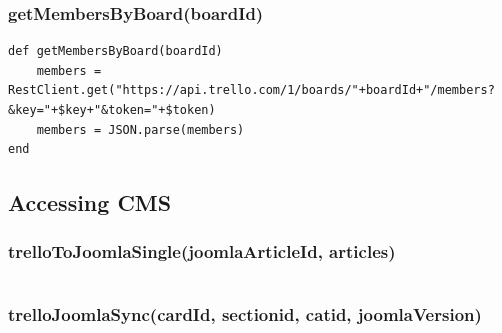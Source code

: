 \subsubsection{getMembersByBoard(boardId)}
\begin{lstlisting}[aboveskip=1\baselineskip, caption= getMembersByBoard(), label=listing060]
def getMembersByBoard(boardId)
	members = RestClient.get("https://api.trello.com/1/boards/"+boardId+"/members?&key="+$key+"&token="+$token)
	members = JSON.parse(members)	
end
\end{lstlisting}

\subsection{Accessing CMS}

\subsubsection{trelloToJoomlaSingle(joomlaArticleId, articles)}
\begin{lstlisting}[aboveskip=1\baselineskip, caption= trelloToJoomlaSingle(), label=listing061]

\end{lstlisting}

\subsubsection{trelloJoomlaSync(cardId, sectionid, catid, joomlaVersion)}
\begin{lstlisting}[aboveskip=1\baselineskip, caption= trelloJoomlaSync(), label=listing062]

\end{lstlisting}




